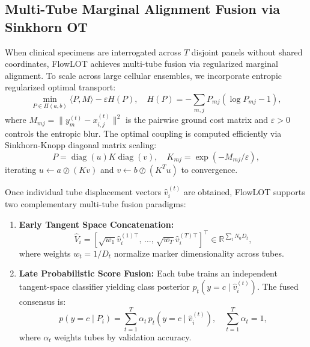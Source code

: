 \documentclass[10pt,journal,compsoc]{IEEEtran}
\begin{document}
\subsection{Multi-Tube Marginal Alignment Fusion via Sinkhorn OT}
When clinical specimens are interrogated across $T$ disjoint panels without shared coordinates, FlowLOT achieves multi-tube fusion via regularized marginal alignment. To scale across large cellular ensembles, we incorporate entropic regularized optimal transport:
\begin{equation}
    \min_{P \in \Pi(a, b)} \langle P, M \rangle - \varepsilon H(P), \quad H(P) = -\sum_{m,j} P_{mj} (\log P_{mj} - 1),
\end{equation}
where $M_{mj} = \| y_m^{(t)} - x_{i,j}^{(t)} \|^2$ is the pairwise ground cost matrix and $\varepsilon > 0$ controls the entropic blur. The optimal coupling is computed efficiently via Sinkhorn-Knopp diagonal matrix scaling:
\begin{equation}
    P = \operatorname{diag}(u) K \operatorname{diag}(v), \quad K_{mj} = \exp(-M_{mj} / \varepsilon),
\end{equation}
iterating $u \leftarrow a \oslash (K v)$ and $v \leftarrow b \oslash (K^T u)$ to convergence.

Once individual tube displacement vectors $\hat{v}_i^{(t)}$ are obtained, FlowLOT supports two complementary multi-tube fusion paradigms:
\begin{enumerate}
    \item \textbf{Early Tangent Space Concatenation:}
    \begin{equation}
        \hat{V}_i = \left[ \sqrt{w_1} \hat{v}_i^{(1)\top}, \, \dots, \, \sqrt{w_T} \hat{v}_i^{(T)\top} \right]^\top \in \mathbb{R}^{\sum_t N_0 D_t},
    \end{equation}
    where weights $w_t = 1/D_t$ normalize marker dimensionality across tubes.
    \item \textbf{Late Probabilistic Score Fusion:} Each tube trains an independent tangent-space classifier yielding class posterior $p_t(y=c \mid \hat{v}_i^{(t)})$. The fused consensus is:
    \begin{equation}
        p(y=c \mid P_i) = \sum_{t=1}^T \alpha_t \, p_t(y=c \mid \hat{v}_i^{(t)}), \quad \sum_{t=1}^T \alpha_t = 1,
    \end{equation}
    where $\alpha_t$ weights tubes by validation accuracy.
\end{enumerate}

\end{document}
